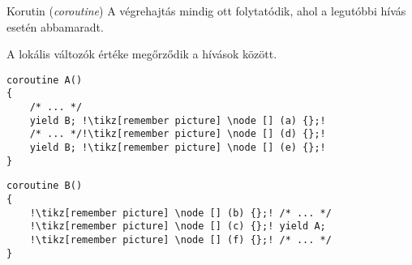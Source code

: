 \begin{frame}[fragile]{Korutin (\textit{coroutine})}
A végrehajtás mindig ott folytatódik, ahol a legutóbbi hívás esetén abbamaradt.

A lokális változók értéke megőrződik a hívások között.
\\
\begin{center}
\begin{minipage}{.40\textwidth}
\begin{lstlisting}[escapechar=!, keywords={coroutine, yield}]
coroutine A()
{
    /* ... */
    yield B; !\tikz[remember picture] \node [] (a) {};!
    /* ... */!\tikz[remember picture] \node [] (d) {};!
    yield B; !\tikz[remember picture] \node [] (e) {};!
}
\end{lstlisting}
\end{minipage}\hfill
\begin{minipage}{.50\textwidth}
\begin{lstlisting}[escapechar=!, showlines=true, keywords={coroutine, yield}]
coroutine B()
{
    !\tikz[remember picture] \node [] (b) {};! /* ... */
    !\tikz[remember picture] \node [] (c) {};! yield A; 
    !\tikz[remember picture] \node [] (f) {};! /* ... */
}

\end{lstlisting}
\end{minipage}
\end{center}
\par
\end{frame}



